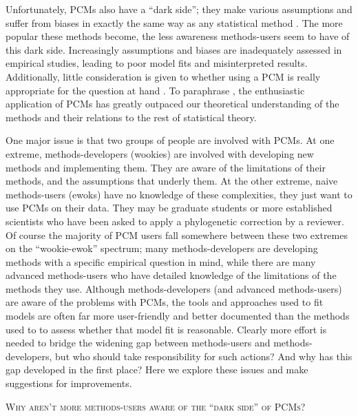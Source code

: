 \documentclass[a4paper,12pt]{article}
\renewcommand{\section}[1]{
  \bigskip
  \begin{center}
  \begin{Large}
  \normalfont\scshape #1
  \medskip
  \end{Large}
  \end{center}
}
\begin{document}
Unfortunately, PCMs also have a ``dark side''; they make various assumptions and suffer from biases in exactly the same way as any statistical method \citep{freckleton2009seven,boettiger2012your}. 
The more popular these methods become, the less awareness methods-users seem to have of this dark side. Increasingly assumptions and biases are inadequately assessed in empirical studies, leading to poor model fits and misinterpreted results. 
Additionally, little consideration is given to whether using a PCM is really appropriate for the question at hand \citep{losos2011seeing}. 
To paraphrase \citet{blomberg2012independent}, the enthusiastic application of PCMs has greatly outpaced our theoretical understanding of the methods and their relations to the rest of statistical theory.


One major issue is that two groups of people are involved with PCMs. 
At one extreme, methods-developers (wookies) are involved with developing new methods and implementing them. They are aware of the limitations of their methods, and the assumptions that underly them. 
At the other extreme, naive methods-users (ewoks) have no knowledge of these complexities, they just want to use PCMs on their data. 
They may be graduate students or more established scientists who have been asked to apply a phylogenetic correction by a reviewer. 
Of course the majority of PCM users fall somewhere between these two extremes on the ``wookie-ewok'' spectrum; many methods-developers are developing methods with a specific empirical question in mind, while there are many advanced methods-users who have detailed knowledge of the limitations of the methods they use. 
Although methods-developers (and advanced methods-users) are aware of the problems with PCMs, the tools and approaches used to fit models are often far more user-friendly and better documented than the methods used to to assess whether that model fit is reasonable. 
Clearly more effort is needed to bridge the widening gap between methods-users and methods-developers, but who should take responsibility for such actions? And why has this gap developed in the first place? Here we explore these issues and make suggestions for improvements.\\ %

\section{Why aren't more methods-users aware of the ``dark side'' of PCMs?}
\end{document}
